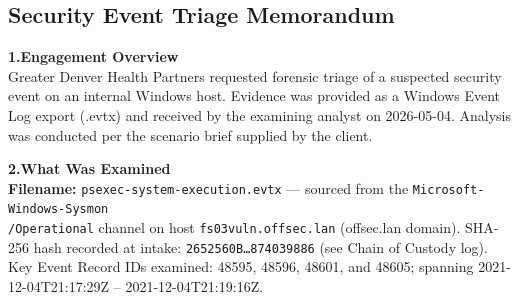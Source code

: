 \documentclass[10pt]{article}
\begin{document}
\begin{singlespace}
\section{Security Event Triage Memorandum}

\medskip
\textbf{\textcolor{headercol}{1.\enspace Engagement Overview}}\\
Greater Denver Health Partners requested forensic triage of a suspected security event on an internal Windows host.
Evidence was provided as a Windows Event Log export (.evtx) and received by the examining analyst on 2026-05-04.
Analysis was conducted per the scenario brief supplied by the client.

\medskip
\textbf{\textcolor{headercol}{2.\enspace What Was Examined}}\\
\textbf{Filename:} \texttt{psexec-system-execution.evtx} --- sourced from the \texttt{Microsoft-Windows-Sysmon\\/Operational}
channel on host \texttt{fs03vuln.offsec.lan} (offsec.lan domain).
SHA-256 hash recorded at intake: \texttt{2652560B\ldots{}874039886} (see Chain of Custody log).
Key Event Record IDs examined: 48595, 48596, 48601, and 48605; spanning 2021-12-04T21:17:29Z -- 2021-12-04T21:19:16Z.


\end{singlespace}
\end{document}
